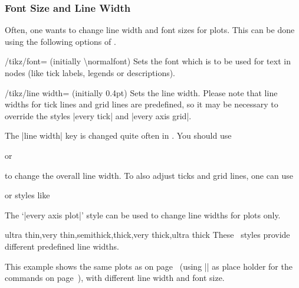 \subsubsection{Font Size and Line Width}
Often, one wants to change line width and font sizes for plots. This can be done using the following options of \Tikz.

\begin{key}{/tikz/font= (initially \textbackslash normalfont)}
	Sets the font which is to be used for text in nodes (like tick labels, legends or descriptions).
\end{key}

\begin{key}{/tikz/line width= (initially 0.4pt)}
	Sets the line width. Please note that line widths for tick lines and grid lines are predefined, so it may be necessary to override the styles |every tick| and |every axis grid|.

	The |line width| key is changed quite often in \Tikz. You should use
\begin{codeexample}
\end{codeexample}
	or
\begin{codeexample}
\end{codeexample}
	to change the overall line width. To also adjust ticks and grid lines, one can use
\begin{codeexample}
\end{codeexample}
	or styles like
\begin{codeexample}
\end{codeexample}
	The `|every axis plot|' style can be used to change line widths for plots only.
\end{key}

\begin{keylist}[/tikz]{ultra thin,very thin,semithick,thick,very thick,ultra thick}
	These \Tikz\ styles provide different predefined line widths.
\end{keylist}

This example shows the same plots as on page~\pageref{page:plotcoords:src} (using |\plotcoords| as place holder for the commands on page~\pageref{page:plotcoords:src}), with different line width and font size.
\begin{codeexample}[]
\end{codeexample}

